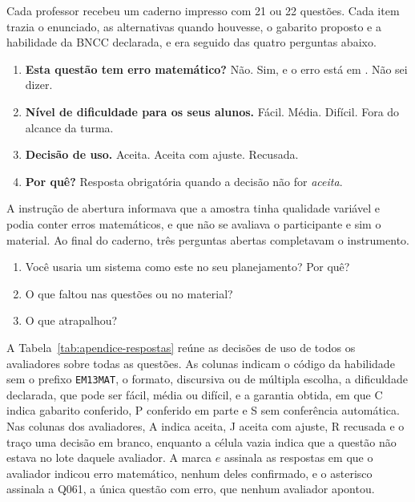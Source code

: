 Cada professor recebeu um caderno impresso com 21 ou 22 questões. Cada item trazia o enunciado, as
alternativas quando houvesse, o gabarito proposto e a habilidade da BNCC declarada, e era seguido das
quatro perguntas abaixo.

\begin{enumerate}
\item \textbf{Esta questão tem erro matemático?} Não. Sim, e o erro está em \underline{\hspace{4cm}}.
  Não sei dizer.
\item \textbf{Nível de dificuldade para os seus alunos.} Fácil. Média. Difícil. Fora do alcance da
  turma.
\item \textbf{Decisão de uso.} Aceita. Aceita com ajuste. Recusada.
\item \textbf{Por quê?} Resposta obrigatória quando a decisão não for \emph{aceita}.
\end{enumerate}

A instrução de abertura informava que a amostra tinha qualidade variável e podia conter erros
matemáticos, e que não se avaliava o participante e sim o material. Ao final do caderno, três
perguntas abertas completavam o instrumento.

\begin{enumerate}
\item Você usaria um sistema como este no seu planejamento? Por quê?
\item O que faltou nas questões ou no material?
\item O que atrapalhou?
\end{enumerate}

A Tabela~\ref{tab:apendice-respostas} reúne as decisões de uso de todos os avaliadores sobre todas
as questões. As colunas indicam o código da habilidade sem o prefixo \texttt{EM13MAT}, o formato,
discursiva ou de múltipla escolha, a dificuldade declarada, que pode ser fácil, média ou difícil, e
a garantia obtida, em que C indica gabarito conferido, P conferido em parte e S sem conferência
automática. Nas colunas dos avaliadores, A indica aceita, J aceita com ajuste, R recusada e o
traço uma decisão em branco, enquanto a célula vazia indica que a questão não estava no lote daquele
avaliador. A marca $e$ assinala as respostas em que o avaliador indicou erro matemático, nenhum deles
confirmado, e o asterisco assinala a Q061, a única questão com erro, que nenhum avaliador apontou.



